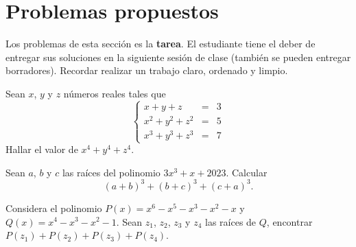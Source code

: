 \section{Problemas propuestos}

Los problemas de esta sección es la \textbf{tarea}.
El estudiante tiene el deber de entregar sus soluciones en la siguiente sesión de clase (también se pueden entregar borradores).
Recordar realizar un trabajo claro, ordenado y limpio.

\begin{multicols}{2}
    \begin{problem}
        Sean $x$, $y$ y $z$ números reales tales que
        \[
            \left\{
            \begin{array}{rcl}
                x + y + z & =& 3\\
                x^2 + y^2 + z^2 & =& 5\\
                x^3 + y^3 + z^3 & =& 7
            \end{array}
            \right.
        \]
        Hallar el valor de $x^4 + y^4 + z^4$.
    \end{problem}

    \begin{problem}
        Sean $a$, $b$ y $c$ las raíces del polinomio $3x^3 + x + 2023$.
        Calcular \[(a + b)^3 + (b + c)^3 + (c + a)^3.\]
    \end{problem}

    \begin{problem}
        Considera el polinomio $P(x) = x^6 - x^5 - x^3 - x^2 - x$ y $Q(x) = x^4 - x^3 - x^2 - 1$.
        Sean $z_1$, $z_2$, $z_3$ y $z_4$ las raíces de $Q$, encontrar $P(z_1) + P(z_2) + P(z_3) + P(z_4)$.
    \end{problem}
\end{multicols}